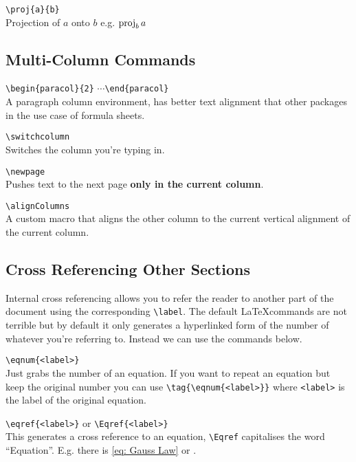 \documentclass[a4paper, 12pt, english]{article}
\begin{document}
            \verb+\proj{a}{b}+\\
            Projection of $a$ onto $b$ e.g. $\proj{a}{b}$


        \subsection{Multi-Column Commands}
            \label{subsec: multi column commands}

            \verb+\begin{paracol}{2}+ $\cdots$\verb+\end{paracol}+\\
            A paragraph column environment, has better text alignment that other packages in the use case of formula sheets.

            \verb+\switchcolumn+\\
            Switches the column you're typing in.

            \verb+\newpage+\\
            Pushes text to the next page {\bfseries only in the current column}.

            \verb+\alignColumns+\\
            A custom macro that aligns the other column to the current vertical alignment of the current column.

        \newpage

        
        \subsection{Cross Referencing Other Sections}
            \label{subsec: cross referencing}

            Internal cross referencing allows you to refer the reader to another part of the document using the corresponding \verb+\label+. The default \LaTeX commands are not terrible but by default it only generates a hyperlinked form of the number of whatever you're referring to. Instead we can use the commands below.

            \verb+\eqnum{<label>}+\\
            Just grabs the number of an equation. If you want to repeat an equation but keep the original number you can use \verb+\tag{\eqnum{<label>}}+ where \verb+<label>+ is the label of the original equation.

            \verb+\eqref{<label>}+ or \verb+\Eqref{<label>}+\\
            This generates a cross reference to an equation, \verb+\Eqref+ capitalises the word ``Equation''. E.g. there is \eqref{eq: Gauss Law} or .
\end{document}
